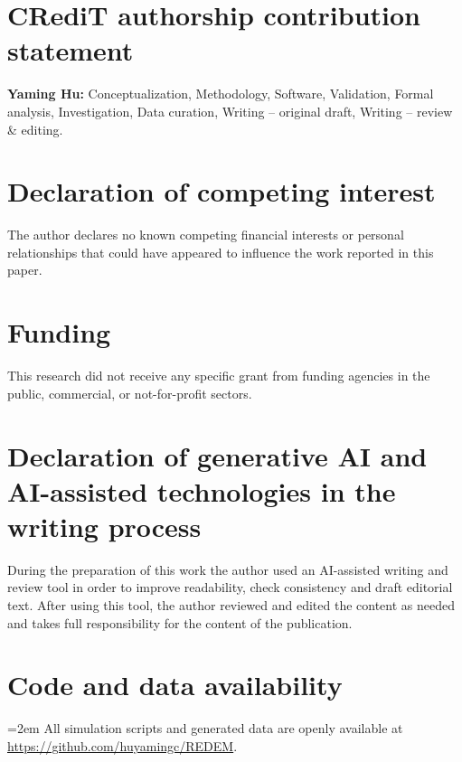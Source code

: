 \documentclass[preprint,12pt]{elsarticle}
\begin{document}
\section*{CRediT authorship contribution statement}

\textbf{Yaming Hu:} Conceptualization, Methodology, Software,
Validation, Formal analysis, Investigation, Data curation,
Writing -- original draft, Writing -- review \& editing.

\section*{Declaration of competing interest}

The author declares no known competing financial interests or personal
relationships that could have appeared to influence the work reported in
this paper.

\section*{Funding}

This research did not receive any specific grant from funding agencies in
the public, commercial, or not-for-profit sectors.

\section*{Declaration of generative AI and AI-assisted technologies in
the writing process}

During the preparation of this work the author used an AI-assisted
writing and review tool in order to improve readability, check
consistency and draft editorial text. After using this tool, the author
reviewed and edited the content as needed and takes full responsibility
for the content of the publication.

\section*{Code and data availability}

{\sloppy\emergencystretch=2em
All simulation scripts and generated data are openly available at
\url{https://github.com/huyamingc/REDEM}.\par}
\end{document}
